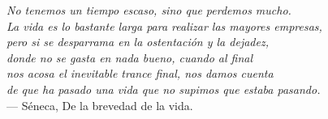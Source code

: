\thispagestyle{empty}
{}

\vspace*{1cm}


\begin{flushright}{\slshape
		No tenemos un tiempo escaso, sino que perdemos mucho. \\
		La vida es lo bastante larga para realizar las mayores empresas,\\
		pero si se desparrama en la ostentación y la dejadez,\\
		donde no se gasta en nada bueno, cuando al final \\
		nos acosa el inevitable trance final, nos damos cuenta \\
		de que ha pasado una vida que no supimos que estaba pasando.} \\ \medskip
		--- Séneca, De la brevedad de la vida.
\end{flushright}

%
